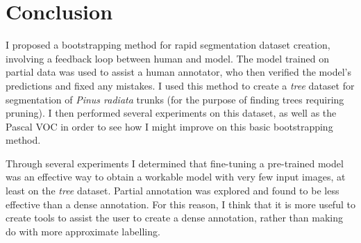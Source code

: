 \section {Conclusion}

I proposed a bootstrapping method for rapid segmentation dataset creation, involving a feedback loop between human and model. The model trained on partial data was used to assist a human annotator, who then verified the model's predictions and fixed any mistakes. I used this method to create a \emph{tree} dataset for segmentation of \emph{Pinus radiata} trunks (for the purpose of finding trees requiring pruning). I then performed several experiments on this dataset, as well as the Pascal VOC in order to see how I might improve on this basic bootstrapping method. 

Through several experiments I determined that fine-tuning a pre-trained model was an effective way to obtain a workable model with very few input images, at least on the \emph{tree} dataset. Partial annotation was explored and found to be less effective than a dense annotation. For this reason, I think that it is more useful to create tools to assist the user to create a dense annotation, rather than making do with more approximate labelling.


